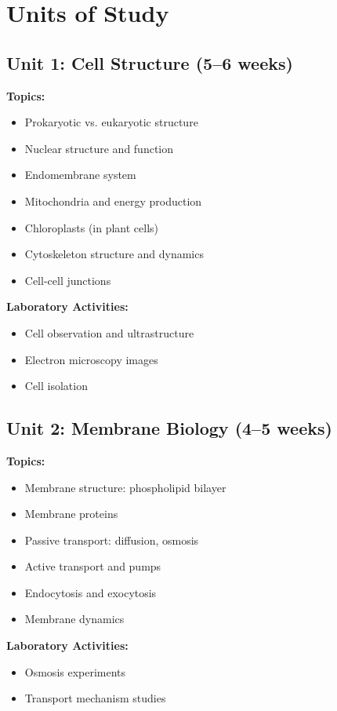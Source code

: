 \documentclass[12pt,oneside]{book}
\begin{document}
\section{Units of Study}

\subsection{Unit 1: Cell Structure (5--6 weeks)}

\textbf{Topics:}
\begin{itemize}
    \item Prokaryotic vs. eukaryotic structure
    \item Nuclear structure and function
    \item Endomembrane system
    \item Mitochondria and energy production
    \item Chloroplasts (in plant cells)
    \item Cytoskeleton structure and dynamics
    \item Cell-cell junctions
\end{itemize}

\textbf{Laboratory Activities:}
\begin{itemize}
    \item Cell observation and ultrastructure
    \item Electron microscopy images
    \item Cell isolation
\end{itemize}

\subsection{Unit 2: Membrane Biology (4--5 weeks)}

\textbf{Topics:}
\begin{itemize}
    \item Membrane structure: phospholipid bilayer
    \item Membrane proteins
    \item Passive transport: diffusion, osmosis
    \item Active transport and pumps
    \item Endocytosis and exocytosis
    \item Membrane dynamics
\end{itemize}

\textbf{Laboratory Activities:}
\begin{itemize}
    \item Osmosis experiments
    \item Transport mechanism studies
\end{itemize}
\end{document}
